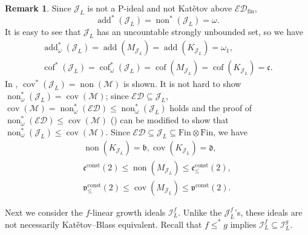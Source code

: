 \documentclass[a4paper,12pt]{amsart}
\theoremstyle{definition}
\newtheorem{rem}[thm]{Remark}
\numberwithin{thm}{section}
\numberwithin{equation}{section}
\newcommand{\bb}{\mathfrak{b}}
\newcommand{\cc}{\mathfrak{c}}
\newcommand{\dd}{\mathfrak{d}}
\newcommand{\ee}{\mathfrak{e}}
\DeclareMathOperator{\non}{non}
\DeclareMathOperator{\cov}{cov}
\DeclareMathOperator{\add}{add}
\DeclareMathOperator{\cof}{cof}
\newcommand{\covm}{\cov(\mathcal{M})}
\newcommand{\nonm}{\non(\mathcal{M})}
\newcommand{\ed}{\mathcal{ED}}
\newcommand{\I}{\mathscr{I}}
\newcommand{\J}{\mathscr{J}}
\newcommand{\edfin}{\mathcal{ED}_\mathrm{fin}}
\newcommand{\finfin}{\mathrm{Fin}\otimes\mathrm{Fin}}
\renewcommand{\subset}{\subseteq}
\newcommand{\vv}{\mathfrak{v}}
\begin{document}
    \begin{rem}
        Since $\J_L$ is not a P-ideal and not Kat\v{e}tov above $\edfin$,
        \[
        \add^*(\J_L) = \non^*(\J_L) = \omega.
        \]
        It is easy to see that $\J_L$ has an uncountable strongly unbounded set, so we have
        \begin{gather*}
            \add^*_\omega(\J_L) = \add(M_{\J_L}) = \add(K_{\J_L}) = \omega_1,\\
            \cof^*(\J_L) = \cof^*_\omega(\J_L) = \cof(M_{\J_L}) = \cof(K_{\J_L}) = \cc.
        \end{gather*}
        In \cite{DFGT21}, $\cov^*(\J_L) = \nonm$ is shown. It is not hard to show $\non^*_\omega(\J_L) = \covm$; since $\ed\subset\J_L$, $\covm=\non^*_\omega(\ed)\leq\non^*_\omega(\J_L)$ holds and the proof of $\non^*_\omega(\ed)\leq\covm$ () can be modified to show that $\non^*_\omega(\J_L)\leq\covm$.
        Since $\ed\subset \J_L \subset \finfin$, we have
        \begin{gather*}
            \non(K_{\J_L}) = \bb, \cov(K_{\J_L}) = \dd, \\
            \ee^{\mathrm{const}}(2) \leq \non(M_{\J_L}) \leq \ee^\mathrm{const}_\leq(2),\\
            \vv^{\mathrm{const}}_{\leq}(2) \leq \cov(M_{\J_L}) \leq \vv^\mathrm{const}(2).
        \end{gather*}
    \end{rem}

    Next we consider the $f$-linear growth ideals $\I^f_L$. Unlike the $\J^f_L$'s, these ideals are not necessarily Kat\v{e}tov--Blass equivalent. Recall that $f \leq^* g$ implies $\I_L^f \subset \I_L^g$.
\end{document}
